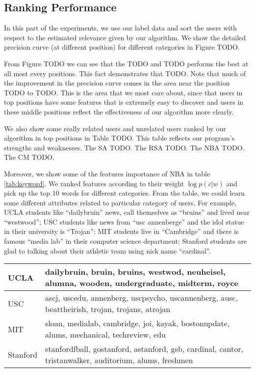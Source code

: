 \documentclass{article}
\begin{document}
\subsection{Ranking Performance}
In this part of the experiments, we use our label data and sort the users with respect to the estimated relevance given by our algorithm. We show the detailed precision curve (at different position) for different categories in Figure TODO.

From Figure TODO we can see that the TODO and TODO performs the best at all most every positions. This fact demonstrates that TODO. Note that much of the improvement in the precision curve comes in the area near the position TODO to TODO. This is the area that we most care about, since that users in top positions have some features that is extremely easy to discover and users in these middle positions reflect the effectiveness of our algorithm more clearly.

We also show some really related users and unrelated users ranked by our algorithm in top positions in Table TODO. This table reflects our program's strengths and weaknesses. The SA TODO. The RSA TODO. The NBA TODO. The CM TODO.

Moreover, we show some of the features importance of NBA in table \ref{tab:keyword}. We ranked features according to their weight $\log p(c|w)$ and pick up the top $10$ words for different categories. From the table, we could learn some different attributes related to particular category of users. For example, UCLA students like ``dailybruin'' news, call themselves as ``bruins'' and lived near ``westwood''; USC students like news from ``usc annenberge'' and the idol statue in their university is ``Trojan''; MIT students live in ``Cambridge'' and there is famous ``media lab'' in their computer science department; Stanford students are glad to talking about their athletic team using nick name ``cardinal''.

\begin{table*}[t]
\centering
\begin{tabular}{|l|l|}
\hline
UCLA & dailybruin, bruin, bruins, westwod, neuheisel, alumna, wooden, undergraduate, midterm, royce \\
\hline
USC & ascj, uscedu, annenberg, uscpsycho, uscannenberg, ausc, beattheirish, trojan, trojans, atrojan \\
\hline
MIT & sloan, medialab, cambridge, joi, kayak, bostonupdate, alums, mechanical, techreview, edu \\
\hline
Stanford & stanfordfball, gostanford, astanford, gsb, cardinal, cantor, tristanwalker, auditorium, alums, freshmen \\
\hline
\end{tabular}
\caption{The keywords in short bio and tweets of users from different universities.}\label{tab:keyword}
\end{table*}
\end{document}
